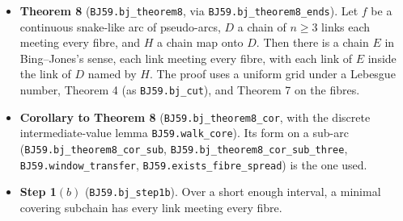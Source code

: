 \documentclass[11pt]{article}
\newcommand{\lean}[1]{\texttt{#1}}
\begin{document}
\begin{itemize}
  \item \textbf{Theorem 8} (\lean{BJ59.\hspace{0pt}bj\_\hspace{0pt}theorem8}, via \lean{BJ59.\hspace{0pt}bj\_\hspace{0pt}theorem8\_\hspace{0pt}ends}). Let $f$ be a continuous snake-like arc of pseudo-arcs, $D$ a chain of $n \geq 3$ links each meeting every fibre, and $H$ a chain map onto $D$. Then there is a chain $E$ in Bing--Jones's sense, each link meeting every fibre, with each link of $E$ inside the link of $D$ named by $H$. The proof uses a uniform grid under a Lebesgue number, Theorem 4 (as \lean{BJ59.\hspace{0pt}bj\_\hspace{0pt}cut}), and Theorem 7 on the fibres.
  \item \textbf{Corollary to Theorem 8} (\lean{BJ59.\hspace{0pt}bj\_\hspace{0pt}theorem8\_\hspace{0pt}cor}, with the discrete intermediate-value lemma \lean{BJ59.\hspace{0pt}walk\_\hspace{0pt}core}). Its form on a sub-arc (\lean{BJ59.\hspace{0pt}bj\_\hspace{0pt}theorem8\_\hspace{0pt}cor\_\hspace{0pt}sub}, \lean{BJ59.\hspace{0pt}bj\_\hspace{0pt}theorem8\_\hspace{0pt}cor\_\hspace{0pt}sub\_\hspace{0pt}three}, \lean{BJ59.\hspace{0pt}window\_\hspace{0pt}transfer}, \lean{BJ59.\hspace{0pt}exists\_\hspace{0pt}fibre\_\hspace{0pt}spread}) is the one used.
  \item \textbf{Step 1$(b)$} (\lean{BJ59.\hspace{0pt}bj\_\hspace{0pt}step1b}). Over a short enough interval, a minimal covering subchain has every link meeting every fibre.
\end{itemize}
\end{document}
